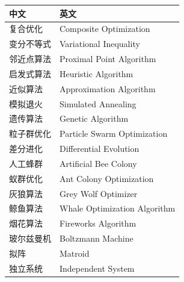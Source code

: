 \begin{table}[htbp]
\centering
\begin{tabular}{@{}ll@{}}
\toprule
\textbf{中文} & \textbf{英文} \\
\midrule
复合优化 & Composite Optimization \\
变分不等式 & Variational Inequality \\
邻近点算法 & Proximal Point Algorithm \\
启发式算法 & Heuristic Algorithm \\
近似算法 & Approximation Algorithm \\
模拟退火 & Simulated Annealing \\
遗传算法 & Genetic Algorithm \\
粒子群优化 & Particle Swarm Optimization \\
差分进化 & Differential Evolution \\
人工蜂群 & Artificial Bee Colony \\
蚁群优化 & Ant Colony Optimization \\
灰狼算法 & Grey Wolf Optimizer \\
鲸鱼算法 & Whale Optimization Algorithm \\
烟花算法 & Fireworks Algorithm \\
玻尔兹曼机 & Boltzmann Machine \\
拟阵 & Matroid \\
独立系统 & Independent System \\
\bottomrule
\end{tabular}
\end{table}

\newpage

